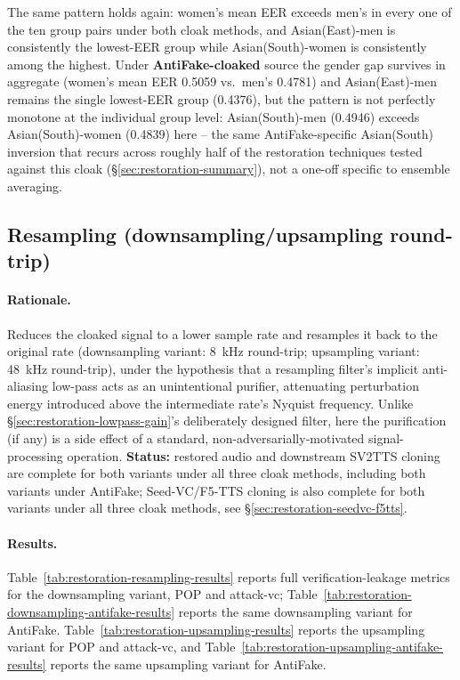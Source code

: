 \documentclass[11pt]{article}
\begin{document}
The same pattern holds again: women's mean EER exceeds men's in every
one of the ten group pairs under both cloak methods, and Asian(East)-men
is consistently the lowest-EER group while Asian(South)-women is
consistently among the highest. Under \textbf{AntiFake-cloaked} source
the gender gap survives in aggregate (women's mean EER 0.5059 vs.\
men's 0.4781) and Asian(East)-men remains the single lowest-EER group
(0.4376), but the pattern is not perfectly monotone at the individual
group level: Asian(South)-men (0.4946) exceeds Asian(South)-women
(0.4839) here -- the same AntiFake-specific Asian(South) inversion that
recurs across roughly half of the restoration techniques tested against
this cloak (\S\ref{sec:restoration-summary}), not a one-off specific to
ensemble averaging.

\subsection{Resampling (downsampling/upsampling round-trip)}
\label{sec:restoration-resampling}

\paragraph{Rationale.} Reduces the cloaked signal to a lower sample
rate and resamples it back to the original rate (downsampling variant:
8~kHz round-trip; upsampling variant: 48~kHz round-trip), under the
hypothesis that a resampling filter's implicit anti-aliasing low-pass
acts as an unintentional purifier, attenuating perturbation energy
introduced above the intermediate rate's Nyquist frequency. Unlike
\S\ref{sec:restoration-lowpass-gain}'s deliberately designed filter,
here the purification (if any) is a side effect of a standard,
non-adversarially-motivated signal-processing operation. \textbf{Status:}
restored audio and downstream SV2TTS cloning are complete for both
variants under all three cloak methods, including both variants under
AntiFake; Seed-VC/F5-TTS cloning is also complete for both variants
under all three cloak methods, see \S\ref{sec:restoration-seedvc-f5tts}.

\paragraph{Results.} Table~\ref{tab:restoration-resampling-results}
reports full verification-leakage metrics for the downsampling variant,
POP and attack-vc; Table~\ref{tab:restoration-downsampling-antifake-results}
reports the same downsampling variant for AntiFake.
Table~\ref{tab:restoration-upsampling-results} reports the upsampling
variant for POP and attack-vc, and
Table~\ref{tab:restoration-upsampling-antifake-results} reports the
same upsampling variant for AntiFake.
\end{document}
